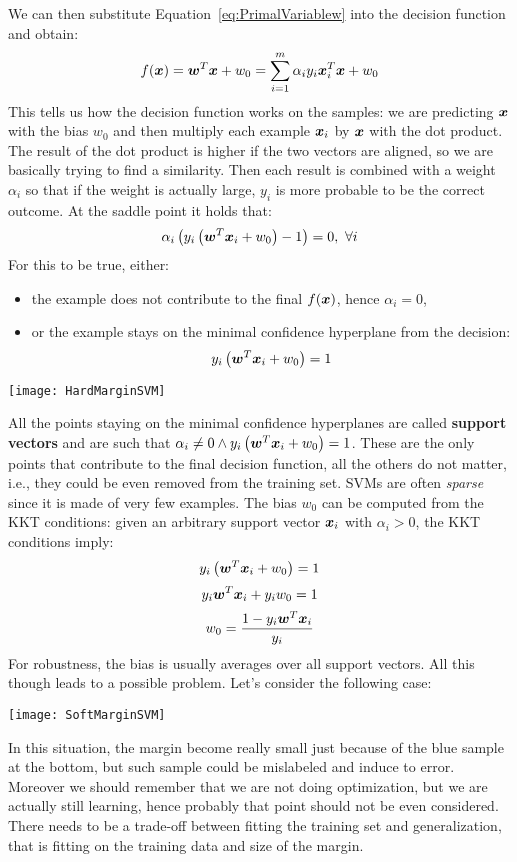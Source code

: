 We can then substitute Equation~\ref{eq:PrimalVariablew} into the decision function and obtain:
\[f(\bm{x})=\bm{w}^T\bm{x}+w_0=\displaystyle\sum_{i=1}^m\alpha_iy_i\bm{x}_i^T\bm{x}+w_0\]
This tells us how the decision function works on the samples: we are predicting $\bm{x}$ with the bias $w_0$ and then multiply each example $\bm{x}_i$ by $\bm{x}$ with the dot product. The result of the dot product is higher if the two vectors are aligned, so we are basically trying to find a similarity. Then each result is combined with a weight $\alpha_i$ so that if the weight is actually large, $y_i$ is more probable to be the correct outcome. \newline
{}
At the saddle point it holds that:
\[\alpha_i\left(y_i\left(\bm{w}^T\bm{x}_i+w_0\right)-1\right)=0,~ \forall i\]
For this to be true, either:
\begin{itemize}
  \item the example does not contribute to the final $f(\bm{x})$, hence $\alpha_i=0$,
  \item or the example stays on the minimal confidence hyperplane from the decision:
    \[y_i\left(\bm{w}^T\bm{x}_i+w_0\right)=1\]
\end{itemize}
\begin{center}
  \texttt{[image: HardMarginSVM]}
\end{center}
All the points staying on the minimal confidence hyperplanes are called \textbf{support vectors} and are such that $\alpha_i\neq 0 \wedge y_i\left(\bm{w}^T\bm{x}_i+w_0\right)=1$. These are the only points that contribute to the final decision function, all the others do not matter, i.e., they could be even removed from the training set. 
SVMs are often \textit{sparse} since it is made of very few examples. \newline
The bias $w_0$ can be computed from the KKT conditions: given an arbitrary support vector $\bm{x}_i$ with $\alpha_i>0$, the KKT conditions imply:
\[y_i\left(\bm{w}^T\bm{x}_i+w_0\right)=1\]
\[y_i\bm{w}^T\bm{x}_i+y_iw_0=1\]
\[w_0=\frac{1-y_i\bm{w}^T\bm{x}_i}{y_i}\]
For robustness, the bias is usually averages over all support vectors. \newline
All this though leads to a possible problem. Let's consider the following case:
\begin{center}
  \texttt{[image: SoftMarginSVM]}
\end{center}
In this situation, the margin become really small just because of the blue sample at the bottom, but such sample could be mislabeled and induce to error. Moreover we should remember that we are not doing optimization, but we are actually still learning, hence probably that point should not be even considered. \newline
There needs to be a trade-off between fitting the training set and generalization, that is fitting on the training data and size of the margin. 
%
%
%

